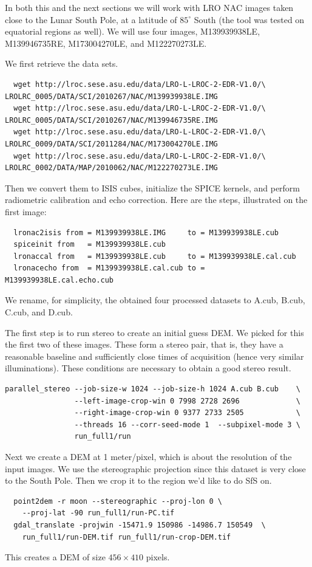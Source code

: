 In both this and the next sections we will work with LRO NAC images taken
close to the Lunar South Pole, at a latitude of $85^\circ$ South (the tool was
tested on equatorial regions as well). We will use four images,
M139939938LE, M139946735RE, M173004270LE, and M122270273LE.

We first retrieve the data sets.
\begin{verbatim}
  wget http://lroc.sese.asu.edu/data/LRO-L-LROC-2-EDR-V1.0/\
LROLRC_0005/DATA/SCI/2010267/NAC/M139939938LE.IMG
  wget http://lroc.sese.asu.edu/data/LRO-L-LROC-2-EDR-V1.0/\
LROLRC_0005/DATA/SCI/2010267/NAC/M139946735RE.IMG
  wget http://lroc.sese.asu.edu/data/LRO-L-LROC-2-EDR-V1.0/\
LROLRC_0009/DATA/SCI/2011284/NAC/M173004270LE.IMG
  wget http://lroc.sese.asu.edu/data/LRO-L-LROC-2-EDR-V1.0/\
LROLRC_0002/DATA/MAP/2010062/NAC/M122270273LE.IMG
\end{verbatim}

Then we convert them to ISIS cubes, initialize the SPICE kernels, and
perform radiometric calibration and echo correction. Here are the steps, 
illustrated on the first image:
\begin{verbatim}  
  lronac2isis from = M139939938LE.IMG     to = M139939938LE.cub
  spiceinit from   = M139939938LE.cub
  lronaccal from   = M139939938LE.cub     to = M139939938LE.cal.cub
  lronacecho from  = M139939938LE.cal.cub to = M139939938LE.cal.echo.cub
\end{verbatim}
We rename, for simplicity, the obtained four processed datasets to
A.cub, B.cub, C.cub, and D.cub.

The first step is to run stereo to create an initial guess DEM. We
picked for this the first two of these images. These form a stereo pair,
that is, they have a reasonable baseline and sufficiently close times of
acquisition (hence very similar illuminations). These conditions are
necessary to obtain a good stereo result.
\begin{verbatim}
parallel_stereo --job-size-w 1024 --job-size-h 1024 A.cub B.cub    \
                --left-image-crop-win 0 7998 2728 2696             \
                --right-image-crop-win 0 9377 2733 2505            \
                --threads 16 --corr-seed-mode 1  --subpixel-mode 3 \
                run_full1/run
\end{verbatim}
Next we create a DEM at 1 meter/pixel, which is about the resolution
of the input images. We use the stereographic projection since this
dataset is very close to the South Pole. Then we crop it to the region
we'd like to do SfS on.
\begin{verbatim}
  point2dem -r moon --stereographic --proj-lon 0 \
    --proj-lat -90 run_full1/run-PC.tif
  gdal_translate -projwin -15471.9 150986 -14986.7 150549  \
    run_full1/run-DEM.tif run_full1/run-crop-DEM.tif
\end{verbatim}
This creates a DEM of size $456 \times 410$ pixels.

